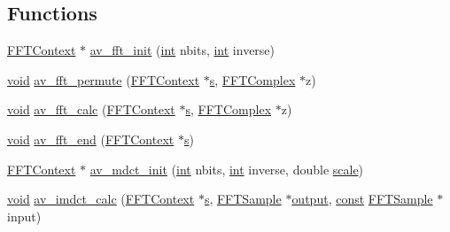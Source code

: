 \subsection*{Functions}
\begin{DoxyCompactItemize}
\item 
\hyperlink{group__lavc__fft_gaac01e094370275491c7cbc580de0fe24}{F\+F\+T\+Context} $\ast$ \hyperlink{group__lavc__fft_ga6c6b88ddaa9aee5b0ec4e2d09a78e286}{av\+\_\+fft\+\_\+init} (\hyperlink{xmltok_8h_a5a0d4a5641ce434f1d23533f2b2e6653}{int} nbits, \hyperlink{xmltok_8h_a5a0d4a5641ce434f1d23533f2b2e6653}{int} inverse)
\item 
\hyperlink{sound_8c_ae35f5844602719cf66324f4de2a658b3}{void} \hyperlink{group__lavc__fft_ga4d8f70cf57c4f969c99af653b8a82f15}{av\+\_\+fft\+\_\+permute} (\hyperlink{group__lavc__fft_gaac01e094370275491c7cbc580de0fe24}{F\+F\+T\+Context} $\ast$\hyperlink{lib_2expat_8h_a755339d27872b13735c2cab829e47157}{s}, \hyperlink{struct_f_f_t_complex}{F\+F\+T\+Complex} $\ast$z)
\item 
\hyperlink{sound_8c_ae35f5844602719cf66324f4de2a658b3}{void} \hyperlink{group__lavc__fft_ga4fe79338f98704178512503f87a4af4c}{av\+\_\+fft\+\_\+calc} (\hyperlink{group__lavc__fft_gaac01e094370275491c7cbc580de0fe24}{F\+F\+T\+Context} $\ast$\hyperlink{lib_2expat_8h_a755339d27872b13735c2cab829e47157}{s}, \hyperlink{struct_f_f_t_complex}{F\+F\+T\+Complex} $\ast$z)
\item 
\hyperlink{sound_8c_ae35f5844602719cf66324f4de2a658b3}{void} \hyperlink{group__lavc__fft_ga9dd6f59f2d27b37fc047d9dc452c6ba5}{av\+\_\+fft\+\_\+end} (\hyperlink{group__lavc__fft_gaac01e094370275491c7cbc580de0fe24}{F\+F\+T\+Context} $\ast$\hyperlink{lib_2expat_8h_a755339d27872b13735c2cab829e47157}{s})
\item 
\hyperlink{group__lavc__fft_gaac01e094370275491c7cbc580de0fe24}{F\+F\+T\+Context} $\ast$ \hyperlink{group__lavc__fft_ga92059089cd3aa014ca07e18677a05f95}{av\+\_\+mdct\+\_\+init} (\hyperlink{xmltok_8h_a5a0d4a5641ce434f1d23533f2b2e6653}{int} nbits, \hyperlink{xmltok_8h_a5a0d4a5641ce434f1d23533f2b2e6653}{int} inverse, double \hyperlink{seqread_8h_a26a42c039941e1d6aa8616c6d7b32541}{scale})
\item 
\hyperlink{sound_8c_ae35f5844602719cf66324f4de2a658b3}{void} \hyperlink{group__lavc__fft_ga356840c227e60047afffbbb34ded5477}{av\+\_\+imdct\+\_\+calc} (\hyperlink{group__lavc__fft_gaac01e094370275491c7cbc580de0fe24}{F\+F\+T\+Context} $\ast$\hyperlink{lib_2expat_8h_a755339d27872b13735c2cab829e47157}{s}, \hyperlink{group__lavc__fft_gaa306dc16df543b25d9910debc3f76b96}{F\+F\+T\+Sample} $\ast$\hyperlink{mm_8c_aeb3fcf4ab0f02cc4420e5a97568a07ef}{output}, \hyperlink{getopt1_8c_a2c212835823e3c54a8ab6d95c652660e}{const} \hyperlink{group__lavc__fft_gaa306dc16df543b25d9910debc3f76b96}{F\+F\+T\+Sample} $\ast$input)

\end{DoxyCompactItemize}
